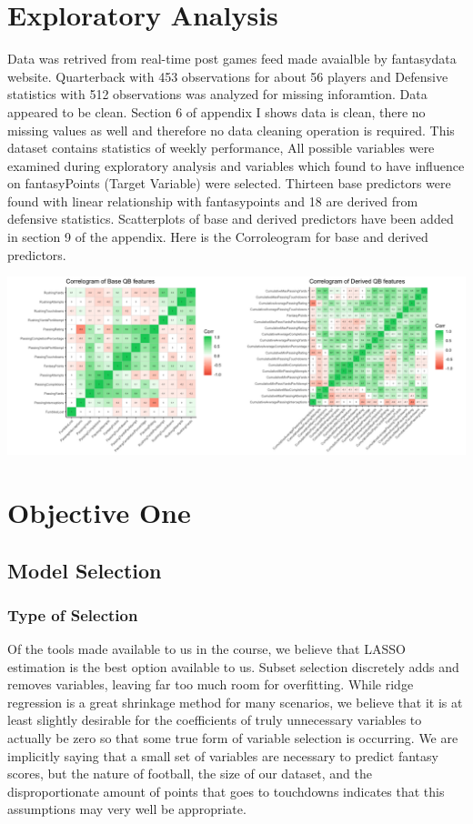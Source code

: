 \documentclass[american,]{article}
\begin{document}
\section{Exploratory Analysis}\label{exploratory-analysis}

Data was retrived from real-time post games feed made avaialble by fantasydata website. Quarterback with 453 observations for about 56 players and Defensive statistics with 512 observations was analyzed for missing inforamtion. Data appeared to be clean. Section 6 of appendix I shows data is clean, there no missing values as well and therefore no data cleaning operation is required. This dataset contains statistics of weekly performance, All possible variables were examined during exploratory analysis and variables which found to have influence on fantasyPoints (Target Variable) were selected. Thirteen base predictors were found with linear relationship with fantasypoints and 18 are derived from defensive statistics. Scatterplots of base and derived predictors have been added in section 9 of the appendix. Here is the Corroleogram for base and derived predictors. 


\graphicspath{ {images/} }
\includegraphics{img001.png}


\section{Objective One}\label{objective-one}

\subsection{Model Selection}\label{model-selection}

\subsubsection{Type of Selection}\label{type-of-selection}

Of the tools made available to us in the course, we believe that LASSO
estimation is the best option available to us. Subset selection
discretely adds and removes variables, leaving far too much room for
overfitting. While ridge regression is a great shrinkage method for many
scenarios, we believe that it is at least slightly desirable for the
coefficients of truly unnecessary variables to actually be zero so that
some true form of variable selection is occurring. We are implicitly
saying that a small set of variables are necessary to predict fantasy
scores, but the nature of football, the size of our dataset, and the
disproportionate amount of points that goes to touchdowns indicates that
this assumptions may very well be appropriate.
\end{document}
